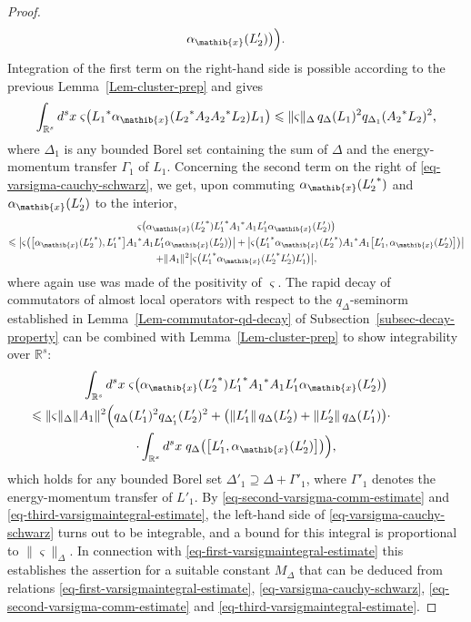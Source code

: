 \documentclass[11pt,twoside,openright]{report}
\theoremstyle{definition}
\theoremstyle{plain}
\theoremstyle{remark}
\theoremstyle{assumption}
\newcommand{\bcomm}[2]{\bigl[ #1 , #2 \bigr]}
\newcommand{\babs}[1]{\bigl\lvert #1 \bigr\rvert}
\newcommand{\norm}[1]{\lVert #1 \rVert}
\newcommand{\qD}{q_\Delta}
\newcommand{\qDx}[1]{q_\Delta ( #1 )}
\newcommand{\bqDx}[1]{q_\Delta \bigl( #1 \bigr)}
\newcommand{\Rs}{\mathbb{R}^s}
\newcommand{\aibx}{\alpha_\mathib{x}}
\begin{document}
\begin{proof}
\begin{multline}
    \aibx ( L'_2 ) \bigr) \Bigr) \text{.}
  \end{multline}
  Integration of the first term on the right-hand side is possible
  according to the previous Lemma~\ref{Lem-cluster-prep} and gives
  \begin{equation}
    \label{eq-second-varsigmaintegral-estimate}
    \int_{\Rs} d^s x \; \varsigma \bigl( {L_1}^* \aibx ( {L_2}^* A_2
    {A_2}^* L_2 ) L_1 \bigr) \leqslant \norm{\varsigma}_\Delta \,
    \qDx{L_1}^2 q_{\Delta_1} ( {A_2}^* L_2 )^2 \text{,}
  \end{equation}
  where $\Delta_1$ is any bounded Borel set containing the sum of
  $\Delta$ and the energy-momentum transfer $\Gamma_1$ of $L_1$. 
  Concerning the second term on the right of
  \eqref{eq-varsigma-cauchy-schwarz}, we get, upon commuting $\aibx (
  {L'_2}^* )$ and $\aibx ( L'_2 )$ to the interior,
  \begin{multline}
    \label{eq-second-varsigma-comm-estimate}
    \varsigma \bigl( \aibx ( {L'_2}^* ) {L'_1}^* {A_1}^* A_1 L'_1
    \aibx ( L'_2 ) \bigr) \\
    \leqslant \babs{\varsigma \bigl( \bcomm{\aibx ( {L'_2}^*
    )}{{L'_1}^*} {A_1}^* A_1 L'_1 \aibx ( L'_2 ) \bigr)} +
    \babs{\varsigma \bigl( {L'_1}^* \aibx ( {L'_2}^* ) {A_1}^* A_1
    \bcomm{L'_1}{\aibx ( L'_2 )} \bigr)} \\
    + \norm{A_1}^2 \babs{\varsigma \bigl( {L'_1}^* \aibx ( {L'_2}^*
    L'_2 ) L'_1 \bigr)} \text{,}
  \end{multline}
  where again use was made of the positivity of $\varsigma$. The rapid
  decay of commutators of almost local operators with respect to the
  $\qD$-seminorm established in Lemma~\ref{Lem-commutator-qd-decay} of
  Subsection~\ref{subsec-decay-property} can be combined with
  Lemma~\ref{Lem-cluster-prep} to show integrability over $\Rs$:
  \begin{multline}
    \label{eq-third-varsigmaintegral-estimate}
    \int_{\Rs} d^s x \; \varsigma \bigl( \aibx ( {L'_2}^* ) {L'_1}^*
    {A_1}^* A_1 L'_1 \aibx ( L'_2 ) \bigr) \\
    \mspace{-70mu} \leqslant \norm{\varsigma}_\Delta \norm{A_1}^2
    \Bigl( \qDx{L'_1}^2 q_{\Delta'_1} ( L'_2 )^2 + \bigl( \norm{L'_1}
    \, \qDx{L'_2} + \norm{L'_2} \, \qDx{L'_1} \bigr) \cdot \\
    \cdot \int_{\Rs} d^s x \; \bqDx{\bcomm{L'_1}{\aibx ( L'_2 )}}
    \Bigr) \text{,}
  \end{multline}
  which holds for any bounded Borel set $\Delta'_1 \supseteq \Delta +
  \Gamma'_1$, where $\Gamma'_1$ denotes the energy-momentum transfer
  of $L'_1$. By \eqref{eq-second-varsigma-comm-estimate} and
  \eqref{eq-third-varsigmaintegral-estimate}, the left-hand side of
  \eqref{eq-varsigma-cauchy-schwarz} turns out to be integrable, and a
  bound for this integral is proportional to
  $\norm{\varsigma}_\Delta$. In connection with
  \eqref{eq-first-varsigmaintegral-estimate} this establishes the
  assertion for a suitable constant $M_\Delta$ that can be deduced
  from relations
  \eqref{eq-first-varsigmaintegral-estimate},
  \eqref{eq-varsigma-cauchy-schwarz},
  \eqref{eq-second-varsigma-comm-estimate}
  and \eqref{eq-third-varsigmaintegral-estimate}.
\end{proof}
\end{document}
